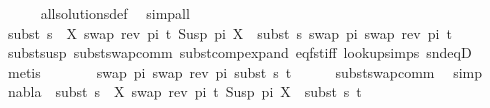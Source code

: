 \begin{isabellebody}
\ \ \ \ \isamarkupfalse%
\ all{\isacharunderscore}{\kern0pt}solutions{\isacharunderscore}{\kern0pt}def\ \isamarkupfalse%
\ simp{\isacharunderscore}{\kern0pt}all\isanewline
\isanewline
\ \ \isamarkupfalse%
\ {\isachardoublequoteopen}subst\ {\isacharparenleft}{\kern0pt}s{}\ {\isasymbullet}\ {\isacharbrackleft}{\kern0pt}{\isacharparenleft}{\kern0pt}X{\isacharcomma}{\kern0pt}\ swap\ {\isacharparenleft}{\kern0pt}rev\ pi{\isacharparenright}{\kern0pt}\ t{\isacharprime}{\kern0pt}{\isacharparenright}{\kern0pt}{\isacharbrackright}{\kern0pt}{\isacharparenright}{\kern0pt}\ {\isacharparenleft}{\kern0pt}Susp\ pi\ X{\isacharparenright}{\kern0pt}\ {\isacharequal}{\kern0pt}\ subst\ s{}\ {\isacharparenleft}{\kern0pt}swap\ pi\ {\isacharparenleft}{\kern0pt}swap\ {\isacharparenleft}{\kern0pt}rev\ pi{\isacharparenright}{\kern0pt}\ t{\isacharprime}{\kern0pt}{\isacharparenright}{\kern0pt}{\isacharparenright}{\kern0pt}{\isachardoublequoteclose}\isanewline
\ \ \ \ \isamarkupfalse%
\ subst{\isacharunderscore}{\kern0pt}susp\ subst{\isacharunderscore}{\kern0pt}swap{\isacharunderscore}{\kern0pt}comm\ subst{\isacharunderscore}{\kern0pt}comp{\isacharunderscore}{\kern0pt}expand\ eq{\isacharunderscore}{\kern0pt}fst{\isacharunderscore}{\kern0pt}iff\ look{\isacharunderscore}{\kern0pt}up{\isachardot}{\kern0pt}simps{\isacharparenleft}{\kern0pt}{}{\isacharparenright}{\kern0pt}\ snd{\isacharunderscore}{\kern0pt}eqD\ \isamarkupfalse%
\ metis\isanewline
\ \ \isamarkupfalse%
\ \isamarkupfalse%
\ {\isachardoublequoteopen}{\isachardot}{\kern0pt}{\isachardot}{\kern0pt}{\isachardot}{\kern0pt}\ {\isacharequal}{\kern0pt}\ swap\ pi\ {\isacharparenleft}{\kern0pt}swap\ {\isacharparenleft}{\kern0pt}rev\ pi{\isacharparenright}{\kern0pt}\ {\isacharparenleft}{\kern0pt}subst\ s{}\ t{\isacharprime}{\kern0pt}{\isacharparenright}{\kern0pt}{\isacharparenright}{\kern0pt}{\isachardoublequoteclose}\isanewline
\ \ \ \ \isamarkupfalse%
\ subst{\isacharunderscore}{\kern0pt}swap{\isacharunderscore}{\kern0pt}comm\ \isamarkupfalse%
\ simp\isanewline
\ \ \isamarkupfalse%
\ {\isachardoublequoteopen}nabla{}\ {\isasymturnstile}\ subst\ {\isacharparenleft}{\kern0pt}s{}\ {\isasymbullet}\ {\isacharbrackleft}{\kern0pt}{\isacharparenleft}{\kern0pt}X{\isacharcomma}{\kern0pt}\ swap\ {\isacharparenleft}{\kern0pt}rev\ pi{\isacharparenright}{\kern0pt}\ t{\isacharprime}{\kern0pt}{\isacharparenright}{\kern0pt}{\isacharbrackright}{\kern0pt}{\isacharparenright}{\kern0pt}\ {\isacharparenleft}{\kern0pt}Susp\ pi\ X{\isacharparenright}{\kern0pt}\ {\isasymapprox}\ subst\ s{}\ t{\isacharprime}{\kern0pt}{\isachardoublequoteclose}\isanewline

\end{isabellebody}
